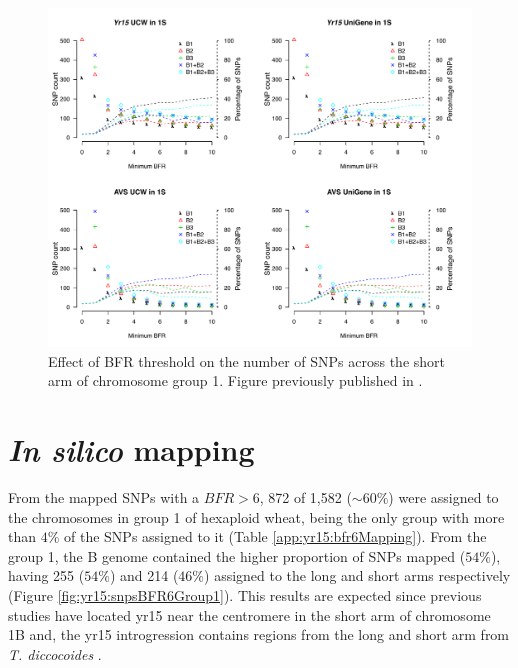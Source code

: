 \begin{figure}
\includegraphics[width=1\textwidth]{Yr15/Figures/bfrChanges.pdf}
\caption[Effect of BFR threshold on the number of SNPs]{Effect of BFR threshold on the number of SNPs across the short arm of chromosome group 1. Figure previously published in \citet{Ramirez-Gonzalez2015b}. }
\label{fig:yr15:bfrChange}
\end{figure}

\section{\textit{In silico} mapping}
\label{sub:yr15:inSilico}
From the mapped SNPs with a $BFR>6$, 872 of 1,582 ($\sim60\%$) were assigned to the chromosomes in group 1 of hexaploid wheat, being the only group with more than $4\%$ of the SNPs assigned to it (Table \ref{app:yr15:bfr6Mapping}). 
From the group 1, the B genome contained the higher proportion of SNPs mapped ($54\%$), having 255 ($54\%$) and 214 ($46\%$) assigned to the long and short arms respectively (Figure \ref{fig:yr15:snpsBFR6Group1}).  
This results are expected since previous studies have located \acrshort{yr15} near the centromere in the short arm of chromosome 1B and, the \acrshort{yr15} introgression contains regions from the long and short arm from \textit{T. diccocoides} \citep{Murphy2009,Peng2000,Grama1997}. 

